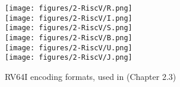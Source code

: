 \begin{figure}[t]
    \begin{centering}
        \texttt{[image: figures/2-RiscV/R.png]}\\
        \texttt{[image: figures/2-RiscV/I.png]}\\
        \texttt{[image: figures/2-RiscV/S.png]}\\
        \texttt{[image: figures/2-RiscV/B.png]}\\
        \texttt{[image: figures/2-RiscV/U.png]}\\
        \texttt{[image: figures/2-RiscV/J.png]}
        \caption[RV64I encoding formats]{RV64I encoding formats, used in \cite{riscv-isa}(Chapter 2.3) }
        \label{fig:rv64i_formats}
    \end{centering}
\end{figure}
